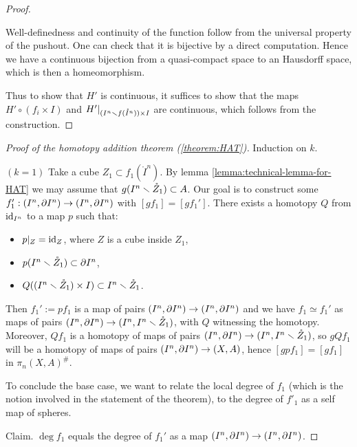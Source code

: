 \begin{proof}
\begin{claimproof}
Well-definedness and continuity of the function follow from the universal property of the pushout. One can check that it is bijective by a direct computation. Hence we have a continuous bijection from a quasi-compact space to an Hausdorff space, which is then a homeomorphism. 
\end{claimproof}

Thus to show that $H'$ is continuous, it suffices to show that the maps $H'\circ (f_i\times I)$ and $H'|_{(I^n\smallsetminus f(\mathring I^n))\times I}$ are continuous, which follows from the construction.
\end{proof}

\begin{proof}[Proof of the homotopy addition theorem (\ref{theorem:HAT})]\renewcommand{\qedsymbol}{\textit{To be continued...}} Induction on $k$.

$(k=1)$ Take a cube $Z_1\subset f_1(\mathring{I}^n)$. By lemma \ref{lemma:technical-lemma-for-HAT} we may assume that $g(I^n\smallsetminus\mathring{Z}_1)\subset A$. Our goal is to construct some $f_1':(I^n,\partial I^n)\to(I^n,\partial I^n)$ with $[gf_1]=[gf_1']$. There exists a homotopy $Q$ from $\operatorname{id}_{I^n}$ to a map $p$ such that:
\begin{itemize}
    \item $p|_{Z}=\operatorname{id}_{Z}$, where $Z$ is a cube inside $Z_1$,
    \item $p(I^n\smallsetminus\mathring{Z}_1)\subset\partial I^n$,
    \item $Q((I^n\smallsetminus\mathring{Z}_1)\times I)\subset I^n\smallsetminus \mathring{Z}_1$.\alvaropls
\end{itemize}
Then $f_1':= pf_1$ is a map of pairs $(I^n,\partial I^n)\to(I^n,\partial I^n)$ and we have $f_1\simeq f_1'$ as maps of pairs $(I^n,\partial I^n)\to(I^n,I^n\smallsetminus \mathring{Z}_1)$, with $Q$ witnessing the homotopy. Moreover, $Qf_1$ is a homotopy of maps of pairs $(I^n,\partial I^n)\to(I^n,I^n\smallsetminus\mathring{Z}_1)$, so $gQf_1$ will be a homotopy of maps of pairs $(I^n,\partial I^n)\to(X,A)$, hence $[gpf_1]=[gf_1]$ in $\pi_n(X,A)^\#$.

To conclude the base case, we want to relate the local degree of $f_1$ (which is the notion involved in the statement of the theorem), to the degree of $f'_1$ as a self map of spheres.

Claim. $\deg f_1$ equals the degree of $f_1'$ as a map $(I^n,\partial I^n)\to(I^n,\partial I^n)$.


\end{proof}
